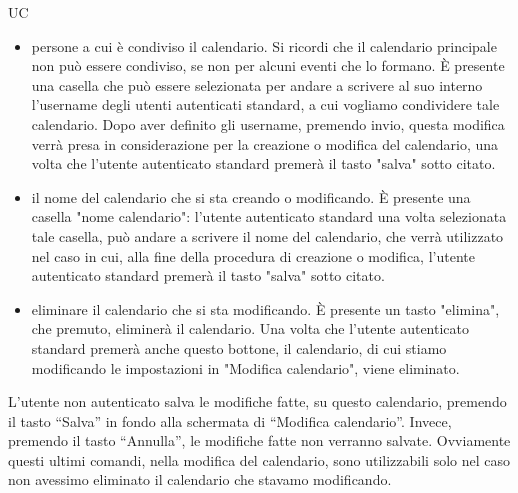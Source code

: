 \begin{listaPersonale}{UC}
\begin{listaPersonale2}[UC] {}
\begin{enumerate}
\begin{itemize}
                          \item persone a cui è condiviso il calendario. Si ricordi che il calendario principale non può essere condiviso, se non per alcuni eventi che lo formano. È presente una casella che può essere selezionata per andare a scrivere al suo interno l'username degli utenti autenticati standard, a cui vogliamo condividere tale calendario.
                                Dopo aver definito gli username, premendo invio, questa modifica verrà presa in considerazione per la creazione o modifica del calendario, una volta che l'utente autenticato standard premerà il tasto "salva" sotto citato.
                          \item il nome del calendario che si sta creando o modificando. È presente una casella "nome calendario": l'utente autenticato standard una volta selezionata tale casella, può andare a scrivere il nome del calendario, che verrà utilizzato nel caso in cui, alla fine della procedura di creazione o modifica, l'utente autenticato standard premerà il tasto "salva" sotto citato.
                          \item eliminare il calendario che si sta modificando. È presente un tasto "elimina", che premuto, eliminerà il calendario. Una volta che l'utente autenticato standard premerà anche questo bottone, il calendario, di cui stiamo modificando le impostazioni in "Modifica calendario", viene eliminato.
                      \end{itemize}
                      L'utente non autenticato salva le modifiche fatte, su questo calendario, premendo il tasto “Salva” in fondo alla schermata di “Modifica calendario”. Invece, premendo il tasto “Annulla”, le modifiche fatte non verranno salvate. Ovviamente questi ultimi comandi, nella modifica del calendario, sono utilizzabili solo nel caso non avessimo eliminato il calendario che stavamo modificando.
            \end{enumerate}



\end{listaPersonale2}
\end{listaPersonale}
